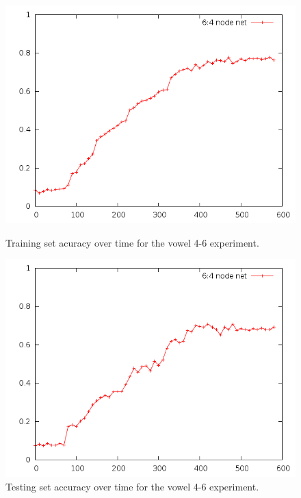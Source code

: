 \documentclass[12pt]{article}
\begin{document}
\begin{figure}[!ht]
    \centering
    \begin{minipage}[b]{0.45\linewidth}
        \includegraphics[width=1.0\textwidth]{vowel-special-training}
        \caption{Training set acuracy over time for the vowel 4-6 experiment.}
        \label{fig:vowel_special_training}
    \end{minipage}
    \quad
    \begin{minipage}[b]{0.45\linewidth}
        \includegraphics[width=1.0\textwidth]{vowel-special-testing}
        \caption{Testing set accuracy over time for the vowel 4-6 experiment.}
        \label{fig:vowel_special_testing}
    \end{minipage}
\end{figure}
\end{document}
